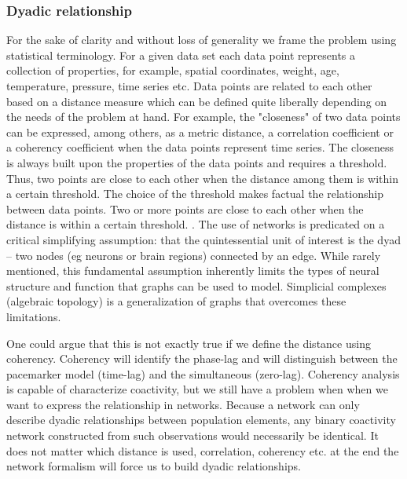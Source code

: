 \documentclass[onecollarge,runningheads]{svjour2}
\begin{document}
\subsubsection{Dyadic relationship}
For the sake of clarity and without loss of generality we frame the problem using statistical terminology.
For a given data set each data point represents a collection of properties, for example, spatial coordinates, weight, age, temperature, pressure, time series etc. Data points are related to each other based on a distance measure which can be defined quite liberally depending on the needs of the problem at hand. For example, the "closeness" of two data points can be expressed, among others, as a metric distance, a correlation coefficient or a coherency coefficient when the data points represent time series.
The closeness is always built upon the properties of the data points and requires a threshold. Thus, two points are close to each other when the distance among them is within a certain threshold. The choice of the threshold makes factual the relationship between data points. Two or more points are close to each other when the distance is within a certain threshold.
\cite{giusti2016two}. The use of networks is predicated on a critical simplifying assumption: that the quintessential unit of interest is the dyad – two nodes (eg neurons or brain regions) connected by an edge. While rarely mentioned, this fundamental assumption inherently
limits the types of neural structure and function that graphs can be used to model. Simplicial complexes (algebraic topology) is a generalization of graphs that overcomes these limitations.


One could argue that this is not exactly true if we define the distance using coherency.
Coherency will identify the phase-lag and will distinguish between the pacemarker model (time-lag) and the simultaneous (zero-lag). %
Coherency analysis is capable of characterize coactivity, but we still have a problem when   when we want to express the relationship in networks. Because a network can only describe dyadic relationships between population elements, any binary coactivity network constructed from such observations would necessarily be identical. 
It does not matter which distance is used, correlation, coherency etc. at the end the network formalism will force us to build dyadic relationships.
\end{document}
